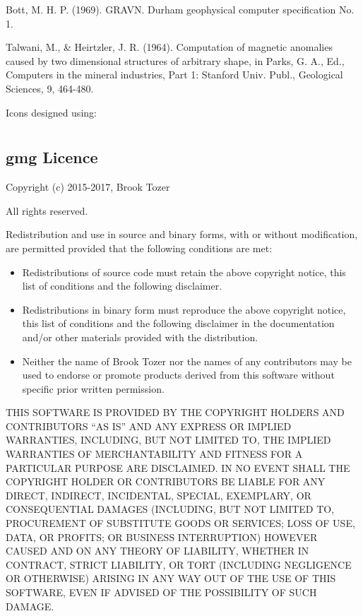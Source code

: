 \documentclass[a4paper,12pt,english]{sphinxmanual}
\begin{document}

Bott, M. H. P. (1969). GRAVN. Durham geophysical computer specification No. 1.


Talwani, M., \& Heirtzler, J. R. (1964). Computation of magnetic anomalies caused by two dimensional structures of
arbitrary shape, in Parks, G. A., Ed., Computers in the mineral industries, Part 1: Stanford Univ. Publ., Geological
Sciences, 9, 464-480.


Icons designed using: 


\chapter{}
\label{\detokenize{licence::doc}}\label{\detokenize{licence:licence}}\label{\detokenize{licence:licencing}}

\section{gmg Licence}
\label{\detokenize{licence:gmg-licence}}
Copyright (c) 2015-2017, Brook Tozer

All rights reserved.

Redistribution and use in source and binary forms, with or without modification,
are permitted provided that the following conditions are met:
\begin{itemize}
\item {} 
Redistributions of source code must retain the above copyright notice,
this list of conditions and the following disclaimer.

\item {} 
Redistributions in binary form must reproduce the above copyright notice,
this list of conditions and the following disclaimer in the documentation
and/or other materials provided with the distribution.

\item {} 
Neither the name of Brook Tozer nor the names of any contributors
may be used to endorse or promote products derived from this software
without specific prior written permission.

\end{itemize}

THIS SOFTWARE IS PROVIDED BY THE COPYRIGHT HOLDERS AND CONTRIBUTORS “AS IS” AND
ANY EXPRESS OR IMPLIED WARRANTIES, INCLUDING, BUT NOT LIMITED TO, THE IMPLIED
WARRANTIES OF MERCHANTABILITY AND FITNESS FOR A PARTICULAR PURPOSE ARE
DISCLAIMED. IN NO EVENT SHALL THE COPYRIGHT HOLDER OR CONTRIBUTORS BE LIABLE FOR
ANY DIRECT, INDIRECT, INCIDENTAL, SPECIAL, EXEMPLARY, OR CONSEQUENTIAL DAMAGES
(INCLUDING, BUT NOT LIMITED TO, PROCUREMENT OF SUBSTITUTE GOODS OR SERVICES;
LOSS OF USE, DATA, OR PROFITS; OR BUSINESS INTERRUPTION) HOWEVER CAUSED AND ON
ANY THEORY OF LIABILITY, WHETHER IN CONTRACT, STRICT LIABILITY, OR TORT
(INCLUDING NEGLIGENCE OR OTHERWISE) ARISING IN ANY WAY OUT OF THE USE OF THIS
SOFTWARE, EVEN IF ADVISED OF THE POSSIBILITY OF SUCH DAMAGE.
\end{document}
